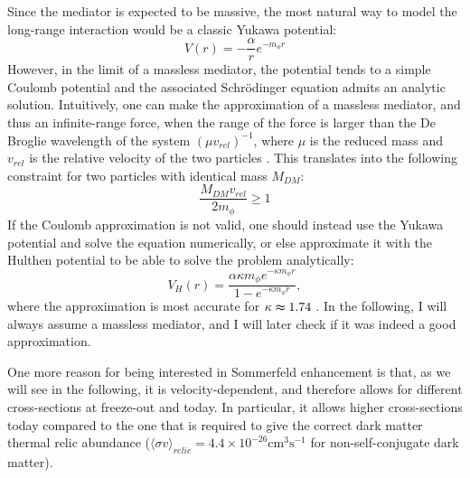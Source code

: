 Since the mediator is expected to be massive, the most natural way to model the long-range interaction would be a classic Yukawa potential:
\begin{equation}
	V(r) = -\frac{\alpha }{r} e^{-m_{\phi } r}
\end{equation}
However, in the limit of a massless mediator, the potential tends to a simple Coulomb potential and the associated Schrödinger equation admits an analytic solution. Intuitively, one can make the approximation of a massless mediator, and thus an infinite-range force, when the range of the force is larger than the De Broglie wavelength of the system \((\mu v_{rel})^{-1} \), where \(\mu \) is the reduced mass and \(v_{rel} \) is the relative velocity of the two particles \cite{Sala_2019}. This translates into the following constraint for two particles with identical mass \(M_{DM} \):
\begin{equation}
	\frac{M_{DM} v_{rel} }{2m_{\phi } }\geq 1
\end{equation}
If the Coulomb approximation is not valid, one should instead use the Yukawa potential and solve the equation numerically, or else approximate it with the Hulthen potential to be able to solve the problem analytically:
\begin{equation}\label{eq:Coulomb_approx}
	V_H(r) = \frac{\alpha \kappa m_{\phi } e^{-\kappa m_{\phi }r }}{1- e^{-\kappa m_{\phi }r }},
\end{equation}
where the approximation is most accurate for \(\kappa \thickapprox 1.74\) \cite{Cirelli_2024}. In the following, I will always assume a massless mediator, and I will later check if it was indeed a good approximation.

One more reason for being interested in Sommerfeld enhancement is that, as we will see in the following, it is velocity-dependent, and therefore allows for different cross-sections at freeze-out and today. In particular, it allows higher cross-sections today compared to the one that is required to give the correct dark matter thermal relic abundance (\(\langle \sigma v \rangle_{relic}=4.4\times 10^{-26} \mathrm{cm^3 s^{-1}}\) for non-self-conjugate dark matter).